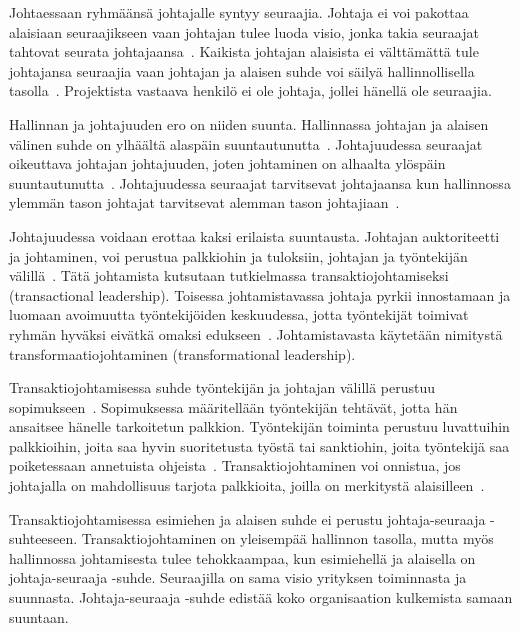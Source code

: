 \documentclass[finnish]{tktltiki2}
\theoremstyle{definition}
\theoremstyle{remark}
\begin{document}
Johtaessaan ryhmäänsä johtajalle syntyy seuraajia. Johtaja ei voi pakottaa alaisiaan seuraajikseen vaan johtajan tulee luoda visio, jonka takia seuraajat tahtovat seurata johtajaansa~\cite{raccoon2006leadership}. Kaikista johtajan alaisista ei välttämättä tule johtajansa seuraajia vaan johtajan ja alaisen suhde voi säilyä hallinnollisella tasolla~\cite{raccoon2006leadership}. Projektista vastaava henkilö ei ole johtaja, jollei hänellä ole seuraajia.

Hallinnan ja johtajuuden ero on niiden suunta. Hallinnassa johtajan ja alaisen välinen suhde on ylhäältä alaspäin suuntautunutta~\cite{raccoon2006leadership}. Johtajuudessa seuraajat oikeuttava johtajan johtajuuden, joten johtaminen on alhaalta ylöspäin suuntautunutta~\cite{raccoon2006leadership}. Johtajuudessa seuraajat tarvitsevat johtajaansa kun hallinnossa ylemmän tason johtajat tarvitsevat alemman tason johtajiaan~\cite{raccoon2006leadership}.

Johtajuudessa voidaan erottaa kaksi erilaista suuntausta. Johtajan auktoriteetti ja johtaminen, voi perustua palkkiohin ja tuloksiin, johtajan ja työntekijän välillä~\cite{bass1990transactional}. Tätä johtamista kutsutaan tutkielmassa transaktiojohtamiseksi (transactional leadership). Toisessa johtamistavassa johtaja pyrkii innostamaan ja luomaan avoimuutta työntekijöiden keskuudessa, jotta työntekijät toimivat ryhmän hyväksi eivätkä omaksi edukseen~\cite{bass1990transactional}. Johtamistavasta käytetään nimitystä  transformaatiojohtaminen (transformational leadership).

Transaktiojohtamisessa suhde työntekijän ja johtajan välillä perustuu sopimukseen~\cite{bass1990transactional}. Sopimuksessa määritellään työntekijän tehtävät, jotta hän ansaitsee hänelle tarkoitetun palkkion. Työntekijän toiminta perustuu luvattuihin palkkioihin, joita saa hyvin suoritetusta työstä tai sanktiohin, joita työntekijä saa poiketessaan annetuista ohjeista~\cite{bass1990transactional}. Transaktiojohtaminen voi onnistua, jos johtajalla on mahdollisuus tarjota palkkioita, joilla on merkitystä alaisilleen~\cite{bass1990transactional}.

Transaktiojohtamisessa esimiehen ja alaisen suhde ei perustu johtaja-seuraaja -suhteeseen. Transaktiojohtaminen on yleisempää hallinnon tasolla, mutta myös hallinnossa johtamisesta tulee tehokkaampaa, kun esimiehellä ja alaisella on johtaja-seuraaja -suhde. Seuraajilla on sama visio yrityksen toiminnasta ja suunnasta. Johtaja-seuraaja -suhde edistää koko organisaation kulkemista samaan suuntaan.
\end{document}
